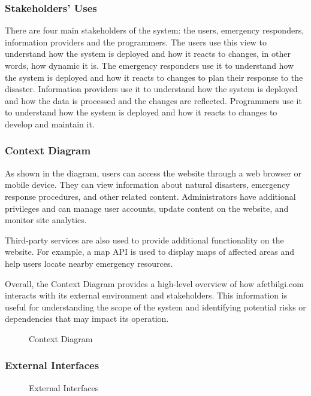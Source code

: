 \documentclass[a4paper]{article}
\begin{document}
    \subsubsection{Stakeholders' Uses}
    There are four main stakeholders of the system: the users, emergency responders, information providers and the programmers.
    The users use this view to understand how the system is deployed and how it reacts to changes, in other words, how dynamic it is.
    The emergency responders use it to understand how the system is deployed and how it reacts to changes to plan their response
    to the disaster. Information providers use it to understand how the system is deployed and how the data is processed and the
    changes are reflected. Programmers use it to understand how the system is deployed and how it reacts to changes to develop
    and maintain it.
    \subsubsection{Context Diagram}
    As shown in the diagram, users can access the website through a web browser or mobile device. They can view information about
    natural disasters, emergency response procedures, and other related content. Administrators have additional privileges and can
    manage user accounts, update content on the website, and monitor site analytics.

    Third-party services are also used to provide additional functionality on the website. For example, a map API is used to
    display maps of affected areas and help users locate nearby emergency resources.

    Overall, the Context Diagram provides a high-level overview of how afetbilgi.com interacts with its external environment and
    stakeholders. This information is useful for understanding the scope of the system and identifying potential risks or
    dependencies that may impact its operation.

    \begin{figure}[H] %
    
    \caption{Context Diagram}
    \end{figure}

    \subsubsection{External Interfaces}
    \begin{figure}[H]
    
    \caption{External Interfaces}
    \end{figure}
\end{document}
